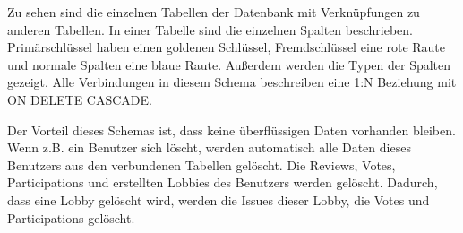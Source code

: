 Zu sehen sind die einzelnen Tabellen der Datenbank mit Verknüpfungen zu anderen Tabellen. In einer Tabelle sind die einzelnen Spalten beschrieben. Primärschlüssel haben einen goldenen Schlüssel, Fremdschlüssel eine rote Raute und normale Spalten eine blaue Raute. Außerdem werden die Typen der Spalten gezeigt. Alle Verbindungen in diesem Schema beschreiben eine 1:N Beziehung mit ON DELETE CASCADE.

Der Vorteil dieses Schemas ist, dass keine überflüssigen Daten vorhanden bleiben. Wenn z.B. ein Benutzer sich löscht, werden automatisch alle Daten dieses Benutzers aus den verbundenen Tabellen gelöscht. Die Reviews, Votes, Participations und erstellten Lobbies des Benutzers werden gelöscht. Dadurch, dass eine Lobby gelöscht wird, werden die Issues dieser Lobby, die Votes und Participations gelöscht.
